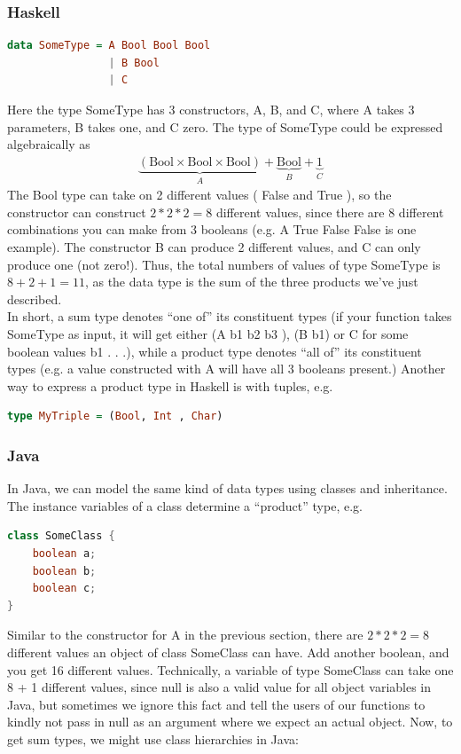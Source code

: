 \documentclass{article}
\begin{document}
\begin{itemize}
            \subsubsection*{Haskell}
            \begin{lstlisting}[language=Haskell]
data SomeType = A Bool Bool Bool
                | B Bool
                | C
            \end{lstlisting}
            Here the type SomeType has 3 constructors, A, B, and C, where A takes 3 parameters, B takes one, and C zero. 
            The type of SomeType could be expressed algebraically as
            \begin{align*}
                \underbrace{(\text{Bool} \times \text{Bool} \times \text{Bool})}_{A} + \underbrace{\text{Bool}}_{B} + \underbrace{1}_{C}
            \end{align*}
            The Bool type can take on 2 different values
            ( False and True ), so the constructor
            can construct $2 * 2 * 2 = 8$ different values, since there are 8 different combinations you can
            make from 3 booleans (e.g. A True False False is one example). The constructor B can
            produce 2 different values, and C can only produce one (not zero!).
            Thus, the total numbers of values of type SomeType is $8 + 2 + 1 = 11$, as the data type
            is the sum of the three products we've just described.\\
            In short, a sum type denotes “one of” its constituent types (if your function takes SomeType
            as input, it will get either (A b1 b2 b3 ), (B b1) or C for some boolean values b1 . . .), while
            a product type denotes “all of” its constituent types (e.g. a value constructed with A will
            have all 3 booleans present.) Another way to express a product type in Haskell is with tuples,
            e.g.
            \begin{lstlisting}[language=Haskell]
type MyTriple = (Bool, Int , Char)
            \end{lstlisting}
            \subsubsection*{Java}
            In Java, we can model the same kind of data types using classes and inheritance. The instance
            variables of a class determine a “product” type, e.g.
            \begin{lstlisting}[language=Java]
class SomeClass {
    boolean a;
    boolean b;
    boolean c;
}
            \end{lstlisting}
        Similar to the constructor for A in the previous section, there are $2 * 2 * 2 = 8$ different
values an object of class SomeClass can have. Add another boolean, and you get 16 different
values. Technically, a variable of type SomeClass can take one 8 + 1 different values, since
null is also a valid value for all object variables in Java, but sometimes we ignore this fact
and tell the users of our functions to kindly not pass in null as an argument where we expect
an actual object.
Now, to get sum types, we might use class hierarchies in Java:


\end{itemize}
\end{document}

